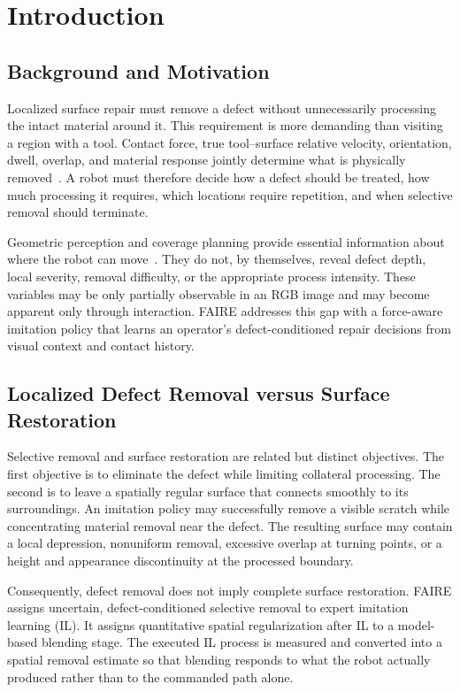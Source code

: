 \chapter{Introduction}
\label{chap:introduction}

\section{Background and Motivation}
Localized surface repair must remove a defect without unnecessarily processing the intact material around it. This requirement is more demanding than visiting a region with a tool. Contact force, true tool--surface relative velocity, orientation, dwell, overlap, and material response jointly determine what is physically removed~\cite{preston1927theory,mohsin2019path,min2024force}. A robot must therefore decide how a defect should be treated, how much processing it requires, which locations require repetition, and when selective removal should terminate.

Geometric perception and coverage planning provide essential information about where the robot can move~\cite{schneyer2023segmentation,mcgovern2024coverage,tafuro2024autonomous}. They do not, by themselves, reveal defect depth, local severity, removal difficulty, or the appropriate process intensity. These variables may be only partially observable in an RGB image and may become apparent only through interaction. FAIRE addresses this gap with a force-aware imitation policy that learns an operator's defect-conditioned repair decisions from visual context and contact history.

\section{Localized Defect Removal versus Surface Restoration}
Selective removal and surface restoration are related but distinct objectives. The first objective is to eliminate the defect while limiting collateral processing. The second is to leave a spatially regular surface that connects smoothly to its surroundings. An imitation policy may successfully remove a visible scratch while concentrating material removal near the defect. The resulting surface may contain a local depression, nonuniform removal, excessive overlap at turning points, or a height and appearance discontinuity at the processed boundary.

Consequently, defect removal does not imply complete surface restoration. FAIRE assigns uncertain, defect-conditioned selective removal to expert imitation learning (IL). It assigns quantitative spatial regularization after IL to a model-based blending stage. The executed IL process is measured and converted into a spatial removal estimate so that blending responds to what the robot actually produced rather than to the commanded path alone.

